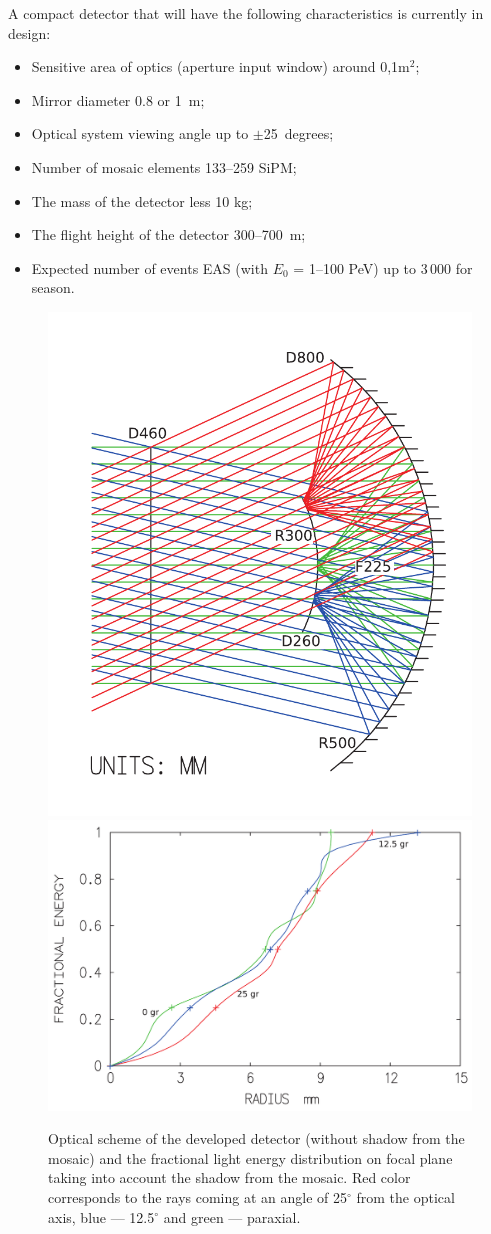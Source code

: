 \documentclass[a4paper,11pt]{article}
\begin{document}
A compact detector that will have the following characteristics is currently in design:

\begin{itemize}
\item Sensitive area of optics (aperture input window) around 0,1m$^2$;
\item Mirror diameter 0.8 or 1~m;
\item Optical system viewing angle up to $\pm$25~degrees;
\item Number of mosaic elements 133--259 SiPM;
\item The mass of the detector less 10 kg;
\item The flight height of the detector 300--700~m;
\item Expected number of events EAS (with $E_0$ = 1--100 PeV) up to 3\,000 for season.
\end{itemize}

\begin{figure}[bt]
\centering %
\includegraphics[width=.32\textwidth,clip]{Sphere3optic.pdf}
\qquad
\includegraphics[width=.55\textwidth]{Sphere3spot_energy.pdf}
\caption{Optical scheme of the developed detector (without shadow from the mosaic) and the fractional light energy distribution on focal plane taking into account the shadow from the mosaic. Red color corresponds to the rays coming at an angle of 25$^\circ$ from the optical axis, blue --- 12.5$^\circ$ and green --- paraxial.}
\label{fig:optic_sphere3}
\end{figure}
\end{document}
